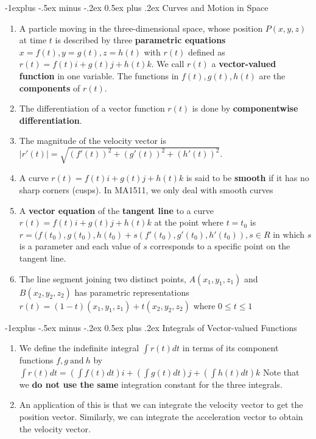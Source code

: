 \documentclass[10pt, landscape]{article}
\makeatletter
\renewcommand{\subsection}{\@startsection{subsection}{2}{0mm}%
                                {-1explus -.5ex minus -.2ex}%
                                {0.5ex plus .2ex}%
                                {\normalfont\normalsize\bfseries}}
\makeatother
\begin{document}
\begin{multicols}{4}
\subsection{Curves and Motion in Space}
\begin{enumerate}
    \item A particle moving in the three-dimensional space, whose position $P(x,y,z)$ at time $t$ is described by three \textbf{parametric equations} $x=f(t), y=g(t), z=h(t)$ with $r(t)$ defined as $
        r(t) = f(t)i+g(t)j+h(t)k$. We call $r(t)$ a \textbf{vector-valued function} in one variable. The functions in $f(t), g(t), h(t)$ are the \textbf{components} of $r(t)$.
    \item The differentiation of a vector function $r(t)$ is done by \textbf{componentwise differentiation}. \\
    \item The magnitude of the velocity vector is $|r'(t)|=\sqrt{(f'(t))^2+(g'(t))^2+(h'(t))^2}$.
    \item A curve $r(t)=f(t)i + g(t)j + h(t)k$ is said to be \textbf{smooth} if it has no sharp corners (cusps). In MA1511, we only deal with smooth curves
    \item A \textbf{vector equation} of the \textbf{tangent line} to a curve $r(t)=f(t)i + g(t)j + h(t)k$ at the point where $t=t_0$ is $r = (f(t_0), g(t_0), h(t_0) + s(f'(t_0), g'(t_0), h'(t_0)), s \in R$
    in which $s$ is a parameter and each value of $s$ corresponds to a specific point on the tangent line.
    \item The line segment joining two distinct points, $A(x_1, y_1, z_1)$ and $B(x_2, y_2, z_2)$ has parametric representations
    $
        r(t)=(1-t)(x_1,y_1,z_1)+t(x_2,y_2,z_2)$ where $0 \leq t \leq 1$
\end{enumerate}

\subsection{Integrals of Vector-valued Functions}
\begin{enumerate}
    \item We define the indefinite integral $\int r(t)dt$ in terms of its component functions $f, g ~\text{and}~h$ by $\int r(t)dt=(\int f(t)dt)i + (\int g(t)dt)j + (\int h(t)dt)k$
    Note that we \textbf{do not use the same} integration constant for the three integrals.
    \item An application of this is that we can integrate the velocity vector to get the position vector. Similarly, we can integrate the acceleration vector to obtain the velocity vector.
\end{enumerate}


\end{multicols}
\end{document}

